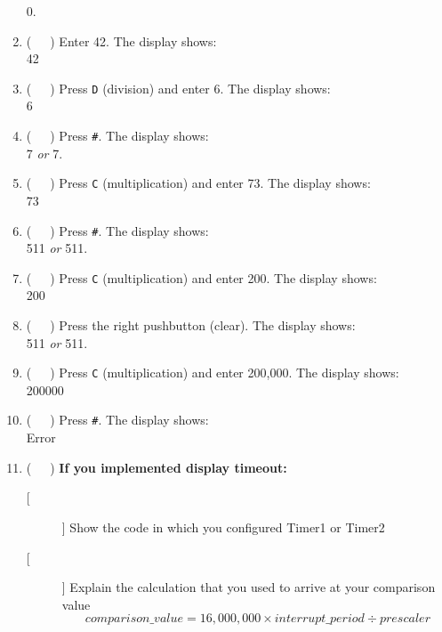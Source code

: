 \begin{enumerate}
    {\dviiseg \phantom{8888888}0.}
\item (\ \ \ ) Enter 42. The display shows:\\
    {\dviiseg \phantom{888888}42}
\item (\ \ \ ) Press \texttt{D} (division) and enter 6. The display
    shows:\\
    {\dviiseg \phantom{8888888}6}
\item (\ \ \ ) Press \texttt{\#}. The display shows:\\
    {\dviiseg \phantom{8888888}7} \hspace{1cm} \textit{or} \hspace{1cm}
    {\dviiseg \phantom{8888888}7.}
\item (\ \ \ ) Press \texttt{C} (multiplication) and enter 73. The display
    shows:\\
    {\dviiseg \phantom{888888}73}
\item (\ \ \ ) Press \texttt{\#}. The display shows:\\
    {\dviiseg \phantom{88888}511} \hspace{1cm} \textit{or} \hspace{1cm}
    {\dviiseg \phantom{88888}511.}
\item (\ \ \ ) Press \texttt{C} (multiplication) and enter 200. The display
    shows:\\
    {\dviiseg \phantom{88888}200}
\item (\ \ \ ) Press the right pushbutton (clear). The display shows: \\
    {\dviiseg \phantom{88888}511} \hspace{1cm} \textit{or} \hspace{1cm}
    {\dviiseg \phantom{88888}511.}
\item (\ \ \ ) Press \texttt{C} (multiplication) and enter 200,000. The display
    shows:\\
    {\dviiseg \phantom{88}200000}
\item (\ \ \ ) Press \texttt{\#}. The display shows:\\
    {\dviiseg \phantom{88}Error}
\item (\ \ \ ) \textbf{If you implemented display timeout:}
    \begin{description}
    \item [[ ]] Show the code in which you configured Timer1 or Timer2
    \item [[ ]] Explain the calculation that you used to arrive at your
        comparison value
        \[comparison\_value = 16,000,000 \times interrupt\_period \div prescaler\]

\end{description}
\end{enumerate}
